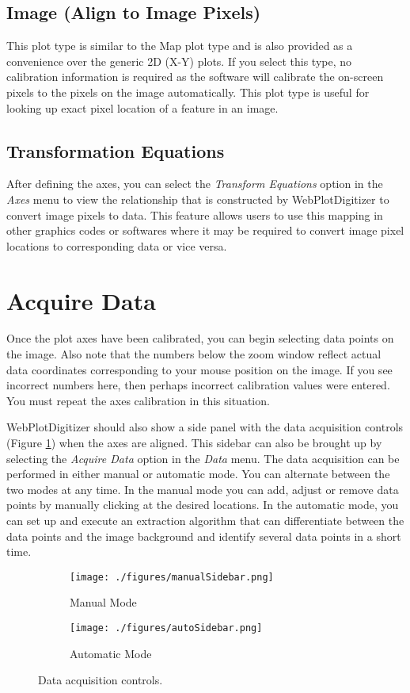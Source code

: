 \documentclass[letterpaper, 10pt]{article}
\begin{document}
\subsection{Image (Align to Image Pixels)}
This plot type is similar to the Map plot type and is also provided as a convenience over the generic 2D (X-Y) plots. If you select this type, no calibration information is required as the software will calibrate the on-screen pixels to the pixels on the image automatically. This plot type is useful for looking up exact pixel location of a feature in an image.

\subsection{Transformation Equations}
After defining the axes, you can select the \emph{Transform Equations} option in the \emph{Axes} menu to view the relationship that is constructed by WebPlotDigitizer to convert image pixels to data. This feature allows users to use this mapping in other graphics codes or softwares where it may be required to convert image pixel locations to corresponding data or vice versa.

\section{Acquire Data}

Once the plot axes have been calibrated, you can begin selecting data points on the image. Also note that the numbers below the zoom window reflect actual data coordinates corresponding to your mouse position on the image. If you see incorrect numbers here, then perhaps incorrect calibration values were entered. You must repeat the axes calibration in this situation. 

WebPlotDigitizer should also show a side panel with the data acquisition controls (Figure \ref{fig:acquireData}) when the axes are aligned. This sidebar can also be brought up by selecting the \emph{Acquire Data} option in the \emph{Data} menu. The data acquisition can be performed in either manual or automatic mode. You can alternate between the two modes at any time. In the manual mode you can add, adjust or remove data points by manually clicking at the desired locations. In the automatic mode, you can set up and execute an extraction algorithm that can differentiate between the data points and the image background and identify several data points in a short time.

\begin{figure}
\centering
{
\begin{subfigure}{0.3\textwidth}
\texttt{[image: ./figures/manualSidebar.png]}
\caption{Manual Mode}
\end{subfigure}
\begin{subfigure}{0.3\textwidth}
\texttt{[image: ./figures/autoSidebar.png]}
\caption{Automatic Mode}
\end{subfigure}
}
\caption{Data acquisition controls.}
\label{fig:acquireData}
\end{figure}
\end{document}
